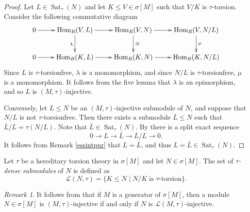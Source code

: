 \documentclass{amsart}
\theoremstyle{definition}
\theoremstyle{remark}
\newtheorem{rem}[thm]{Remark}
\numberwithin{equation}{section}
\DeclareMathOperator{\Hom}{Hom}
\DeclareMathOperator{\Sat}{Sat}
\newcommand{\sm}{\sigma[M]}
\begin{document}
	\begin{proof}
		Let $L\in\Sat_\tau(N)$ and let $K\leq V\in\sm$ 
		such that $V/K$ is $\tau$-torsion. 
		Consider the following commutative diagram
		\[\xymatrix{0\ar[r] & 
			\Hom_R(V,L)\ar[r] \ar[d]_\lambda & 
			\Hom_R(V,N)\ar[r] \ar[d]^\cong & 
			\Hom_R(V,N/L)\ar[d]^\mu \\ 0\ar[r] & 
			\Hom_R(K,L)\ar[r] & 
			\Hom_R(K,N)\ar[r] & 
			\Hom_R(K,N/L)}\]
		Since $L$ is $\tau$-torsionfree, 
		$\lambda$ is a monomorphism,
		and since $N/L$ is $\tau$-torsionfree, 
		$\mu$ is a monomorphism. 
		It follows from the five lemma that $\lambda$ is an epimorphism, 
		and so $L$ is $(M,\tau)$-injective.
		
		Conversely, 
		let $L\leq N$ be an $(M,\tau)$-injective submodule of $N$, 
		and suppose that $N/L$ is not $\tau$-torsionfree. 
		Then there exists a submodule $\overline{L}\leq N$ 
		such that $\overline{L}/L=\tau\left( N/L\right)$. 
		Note that $\overline{L}\in\Sat_\tau(N)$. 
		By \cite[9.11]{wisbauermodules} there is a split exact sequence 
		\[ 0\to L\to \overline{L}\to \overline{L}/L\to 0 . \] 
		It follows from Remark \ref{essintpur} that $L=\overline{L}$, and thus $L=\overline{L}\in\Sat_\tau(N)$.
		\end{proof}
	
	
	Let $\tau$ be a hereditary torsion theory in $\sm$ and let $N\in\sm$. 
	The set of \emph{$\tau$-dense submodules} of $N$ is defined as
	\[\mathcal{L}(N,\tau)=\{K\leq N\mid N/K\;\text{is $\tau$-torsion}\}.\]
	
	
	\begin{rem}\label{linj}
		It follows from \cite[9.11(c)]{wisbauermodules} that 
		if $M$ is a generator of $\sm$, 
		then a module $N\in\sm$ is $(M,\tau)$-injective 
		if and only if 
		$N$ is $\mathcal{L}(M,\tau)$-injective.
	\end{rem}
	
\end{document}
